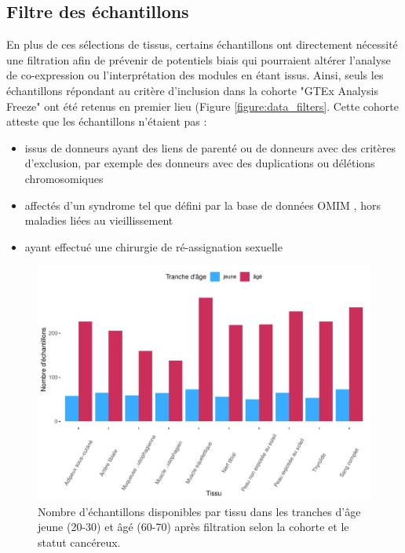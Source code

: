 \subsection{Filtre des échantillons}


En plus de ces sélections de tissus, certains échantillons ont directement nécessité une filtration afin de prévenir de potentiels biais qui pourraient altérer l'analyse de co-expression ou l'interprétation des modules en étant issus. Ainsi, seuls les échantillons répondant au critère d'inclusion dans la cohorte "GTEx Analysis Freeze" ont été retenus en premier lieu (Figure \ref{figure:data_filters}. Cette cohorte atteste que les échantillons n'étaient pas :
\begin{itemize}
    \item issus de donneurs ayant des liens de parenté ou de donneurs avec des critères d'exclusion, par exemple des donneurs avec des duplications ou délétions chromosomiques
    \item affectés d'un syndrome tel que défini par la base de données OMIM , hors maladies liées au vieillissement
    \item ayant effectué une chirurgie de ré-assignation sexuelle

\end{itemize}

\begin{figure}[hb]
    \centering
    \includegraphics[width=1\textwidth]{img/chap2/chap2_sample_count_by_tissu_after_filter.pdf}
    \caption{Nombre d'échantillons disponibles par tissu dans les tranches d'âge jeune (20-30) et âgé (60-70) après filtration selon la cohorte et le statut cancéreux.}
    \label{figure:sample_count_by_tissu_after_filter}
\end{figure}

